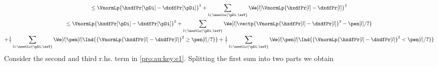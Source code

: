 \begin{pro}
\begin{multline}
\leq \VnormLp{\hxdfPr[\pDi]-\dxdfPr[\pDi]}^2
+\sum_{l\in\nsetlo{\pDi,\ssY}}\We[l]\VnormLp{\hxdfPr[l]-\dxdfPr[l]}^2\\
\leq\VnormLp{\hxdfPr[\pDi]-\dxdfPr[\pDi]}^2
+\sum_{l\in\nsetlo{\pDi,\ssY}}\We[l]\vectp{\VnormLp{\hxdfPr[l]-\dxdfPr[l]}^2-\pen[l]/7}\\
+\tfrac{1}{7}\sum_{l\in\nsetlo{\pDi,\ssY}}\We[l]\pen[l]\Ind{\{\VnormLp{\hxdfPr[l]-\dxdfPr[l]}^2\geq\pen[l]/7\}}
+\tfrac{1}{7}\sum_{l\in\nsetlo{\pDi,\ssY}}\We[l]\pen[l]\Ind{\{\VnormLp{\hxdfPr[l]-\dxdfPr[l]}^2<\pen[l]/7\}}%
\end{multline}
Consider the second and third r.hs. term in \eqref{pro:au:key:e1}.  Splitting the first sum into two parts we obtain
\begin{multline}\label{pro:au:key:e3}

\end{multline}
\end{pro}
